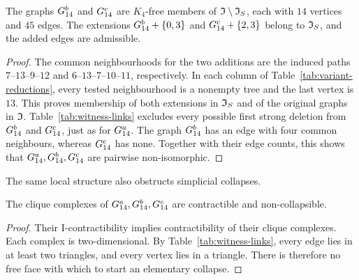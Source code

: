 \begin{proposition}\label{prop:other-seeds}
The graphs $G_{14}^{b}$ and $G_{14}^{c}$ are $K_4$-free members of
$\mathfrak I\setminus\mathfrak I_S$, each with $14$ vertices and $45$ edges.
The extensions $G_{14}^{b}+\{0,3\}$ and $G_{14}^{c}+\{2,3\}$ belong to $\mathfrak I_S$,
and the added edges are admissible.
\end{proposition}

\begin{proof}
The common neighbourhoods for the two additions are the induced paths
$7\text{--}13\text{--}9\text{--}12$ and
$6\text{--}13\text{--}7\text{--}10\text{--}11$, respectively.
In each column of Table~\ref{tab:variant-reductions}, every tested
neighbourhood is a nonempty tree and the last vertex is $13$.
This proves membership of both extensions in $\mathfrak I_S$ and of the original
graphs in $\mathfrak I$. Table~\ref{tab:witness-links} excludes every possible
first strong deletion from $G_{14}^{b}$ and $G_{14}^{c}$, just as for $G_{14}^{a}$.
The graph $G_{14}^{b}$ has an edge with four common neighbours, whereas
$G_{14}^{c}$ has none. Together with their edge counts, this shows that
$G_{14}^{a},G_{14}^{b},G_{14}^{c}$ are pairwise non-isomorphic.
\end{proof}

The same local structure also obstructs simplicial collapses.

\begin{proposition}\label{prop:noncollapsible}
The clique complexes of $G_{14}^{a},G_{14}^{b},G_{14}^{c}$ are contractible and
non-collapsible.
\end{proposition}

\begin{proof}
Their I-contractibility implies contractibility of their clique
complexes. Each complex is two-dimensional. By
Table~\ref{tab:witness-links}, every edge lies in at least two triangles,
and every vertex lies in a triangle. There is therefore no free face
with which to start an elementary collapse.
\end{proof}
